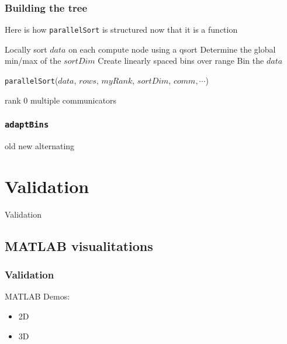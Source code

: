 \documentclass{beamer}
\begin{document}
\begin{frame}
	\frametitle{Building the tree}
	
	Here is how \texttt{parallelSort} is structured now that it is a function
	
	\vspace{10pt}
	
	\begin{algorithm}[H]
		\begin{algorithmic}[1]
			\STATE Locally sort $data$ on each compute node using a qsort
			\STATE Determine the global min/max of the $sortDim$
			\STATE Create linearly spaced bins over range
			\STATE Bin the $data$ 
				\STATE 
			\ENDWHILE
		\end{algorithmic}
		\caption{\texttt{parallelSort}($data$, $rows$, $myRank$, $sortDim$, $comm, \cdots$)}
	\end{algorithm}
		
\end{frame}


rank 0
multiple communicators

\subsubsection{\texttt{adaptBins}}
old
new
alternating





\section{Validation}

\begin{frame}	
	\begin{Huge}
		\begin{center}
			Validation
		\end{center}
	\end{Huge}
\end{frame}

\subsection{MATLAB visualitations}

\begin{frame}	
	\frametitle{Validation}
	
	MATLAB Demos:
	
	\begin{itemize}
		\item 2D
		\item 3D
	\end{itemize}
	
\end{frame}
\end{document}
